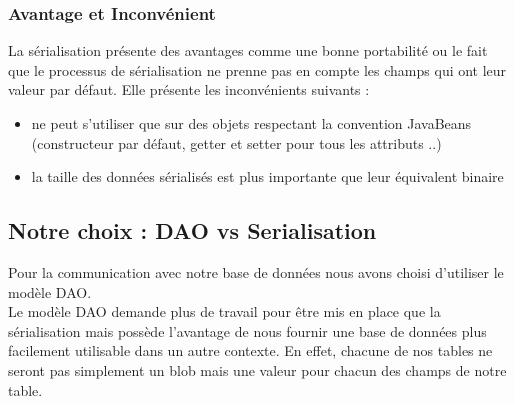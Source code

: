 \subsubsection{Avantage et Inconvénient}
La sérialisation présente des avantages comme une bonne portabilité ou le fait que le processus de sérialisation ne prenne pas en compte les champs qui ont leur valeur par défaut. Elle présente les inconvénients suivants : 
\begin{itemize}
\item ne peut s'utiliser que sur des objets respectant la convention JavaBeans (constructeur par défaut, getter et setter pour tous les attributs ..)
\item la taille des données sérialisés est plus importante que leur équivalent binaire
\end{itemize}


\subsection{Notre choix : DAO vs Serialisation}
Pour la communication avec notre base de données nous avons choisi d'utiliser le modèle DAO. \\

Le modèle DAO demande plus de travail pour être mis en place que la sérialisation mais possède l'avantage de nous fournir une base de données plus facilement utilisable dans un autre contexte. En effet, chacune de nos tables ne seront pas simplement un blob mais une valeur pour chacun des champs de notre table. 